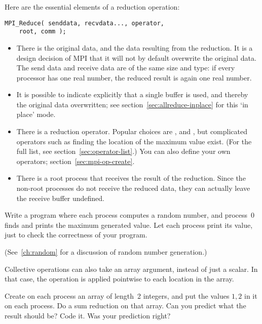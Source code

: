Here are the essential elements of a reduction operation:
\begin{lstlisting}
MPI_Reduce( senddata, recvdata..., operator,
    root, comm ); 
\end{lstlisting}
\begin{itemize}
\item There is the original data, and the data resulting from the
  reduction. It is a design decision of MPI that it will not by
  default overwrite the original data. The send data and receive data
  are of the same size and type: if every processor has one real
  number, the reduced result is again one real number.
\item It is possible to indicate explicitly that a single buffer
  is used, and thereby the original data overwritten;
  see section~\ref{sec:allreduce-inplace} for this `in place' mode.
\item There is a reduction operator. Popular choices are
  ,  and
  , but complicated operators such as finding
  the location of the maximum value exist.
  (For the full list, see section~\ref{sec:operator-list}.)
  You can also define your
  own operators; section~\ref{sec:mpi-op-create}.
\item There is a root process that receives the result of the
  reduction. Since the non-root processes do not receive the reduced
  data, they can actually leave the receive buffer undefined.
\end{itemize}


\begin{exercise}
  \label{ex:randommax}
  Write a program where each process computes a random number, and process~0
  finds and prints the maximum generated value. Let each process print its value,
  just to check the correctness of your program.
\begin{book}
  (See~\ref{ch:random} for a discussion of random number generation.)
\end{book}
\end{exercise}

Collective operations can also take an array argument, instead of just a scalar.
In that case, the operation is applied pointwise to each location in the array.

\begin{exercise}
  \label{ex:randomcoord}
  Create on each process an array of length~2 integers, and put the
  values $1,2$ in it on each process. Do a sum reduction on that
  array. Can you predict what the result should be?  Code it. Was your
  prediction right?
\end{exercise}

